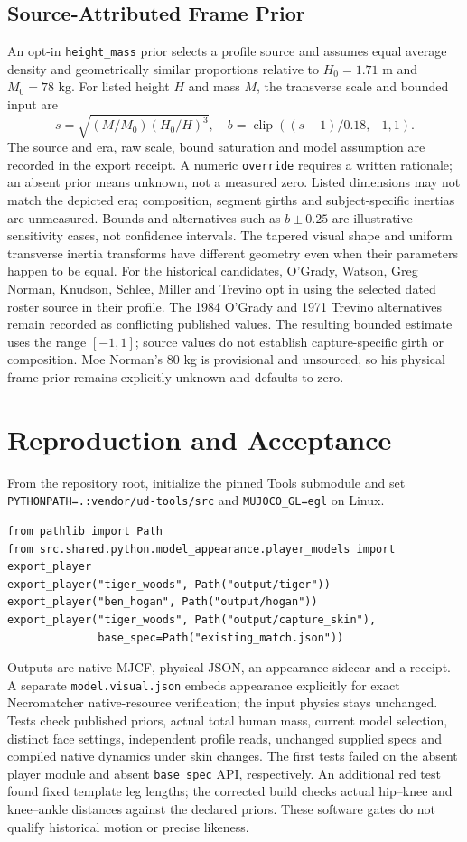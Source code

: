 \documentclass{article}
\begin{document}
\subsection{Source-Attributed Frame Prior}
An opt-in \texttt{height\_mass} prior selects a profile source and assumes
equal average density and geometrically similar proportions relative to
$H_0=1.71$ m and $M_0=78$ kg. For listed height $H$ and mass $M$, the
transverse scale and bounded input are
\[s=\sqrt{(M/M_0)(H_0/H)^3},\quad b=\operatorname{clip}((s-1)/0.18,-1,1).\]
The source and era, raw scale, bound saturation and model assumption are
recorded in the export receipt. A numeric \texttt{override} requires a
written rationale; an absent prior means unknown, not a measured zero.
Listed dimensions may not match the depicted era; composition, segment girths
and subject-specific inertias are unmeasured. Bounds and alternatives such as
$b\pm0.25$ are illustrative sensitivity cases, not confidence intervals.
The tapered visual shape and uniform transverse inertia transforms have
different geometry even when their parameters happen to be equal.
For the historical candidates, O'Grady, Watson, Greg Norman, Knudson,
Schlee, Miller and Trevino opt in using the selected dated roster source in
their profile. The 1984 O'Grady and 1971 Trevino alternatives remain recorded
as conflicting published values. The resulting bounded estimate uses the
range $[-1,1]$; source values do not establish capture-specific girth or
composition. Moe Norman's 80 kg is provisional and unsourced, so his
physical frame prior remains explicitly unknown and defaults to zero.
\section{Reproduction and Acceptance}
From the repository root, initialize the pinned Tools submodule and set
\texttt{PYTHONPATH=.:vendor/ud-tools/src} and \texttt{MUJOCO\_GL=egl} on Linux.
\begin{verbatim}
from pathlib import Path
from src.shared.python.model_appearance.player_models import export_player
export_player("tiger_woods", Path("output/tiger"))
export_player("ben_hogan", Path("output/hogan"))
export_player("tiger_woods", Path("output/capture_skin"),
              base_spec=Path("existing_match.json"))
\end{verbatim}
Outputs are native MJCF, physical JSON, an appearance sidecar and a receipt.
A separate \texttt{model.visual.json} embeds appearance explicitly for exact
Necromatcher native-resource verification; the input physics stays unchanged.
Tests check published priors, actual total human mass, current model selection,
distinct face settings, independent profile reads, unchanged supplied specs
and compiled native dynamics under skin changes. The first tests failed on
the absent player module and absent \texttt{base\_spec} API, respectively.
An additional red test found fixed template leg lengths; the corrected build
checks actual hip--knee and knee--ankle distances against the declared priors.
These software gates do not qualify historical motion or precise likeness.
\end{document}
